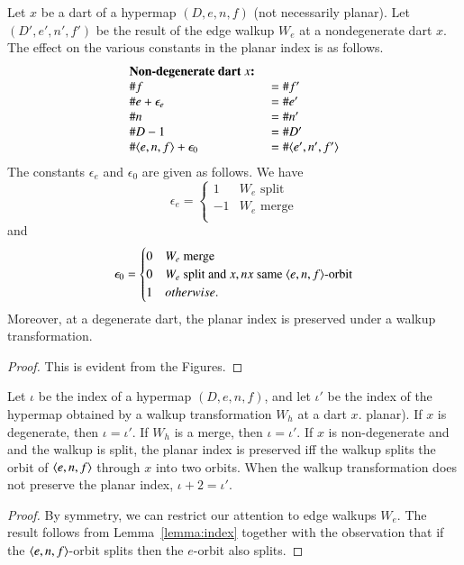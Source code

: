 \begin{lemma}\label{lemma:index} Let $x$ be a dart of a hypermap $(D,e,n,f)$ (not necessarily
planar). Let $(D',e',n',f')$ be the result of the edge walkup $W_e$ at
a nondegenerate dart $x$.  
The effect on the various constants in the planar index is as
follows.
    $$
    \begin{array}{lll}
    \text{\bf Non-degenerate dart $x$: }&\\
    \# f &= \# f'\\  
    \# e + \epsilon_e &= \# e'\\
    \# n &= \# n'\\
    \# D - 1&= \# D' \\
    \# \langle e,n,f\rangle + \epsilon_0&= \#\langle e',n',f'\rangle\\
    \end{array}
    $$
The constants $\epsilon_e$ and $\epsilon_0$ are given as follows.
We have 
   $$
   \epsilon_e = \begin{cases}
     1 & W_e \text{ split }\\
    -1 & W_e \text{ merge}\\
   \end{cases}
   $$
and
   $$
   \epsilon_0 = \begin{cases}
    0 & W_e \text{ merge }\\
    0 & W_e \text{ split and } x,nx \text{ same } \langle e,n,f\rangle\text{-orbit}\\
    1 & otherwise.
     \end{cases}
   $$
Moreover, at a degenerate dart, the planar index is preserved under a
walkup transformation.
\end{lemma}

\begin{proof} This is evident from the Figures.
\end{proof}

\begin{lemma}  Let $\iota$ be the index of a  hypermap $(D,e,n,f)$, and
let $\iota'$ be the index of the hypermap obtained by a walkup transformation
$W_h$
at a dart $x$.
planar).   If $x$ is degenerate, then $\iota=\iota'$.
If $W_h$ is a merge, then $\iota=\iota'$.
If $x$ is non-degenerate and and the walkup is
split, the planar index is preserved iff the walkup splits the orbit of
$\langle e,n,f\rangle$ through $x$ into two orbits. When the walkup transformation
does not preserve the planar index, $\iota+2=\iota'$.
\end{lemma}

\begin{proof}  By symmetry, we can restrict our attention to 
edge walkups $W_e$.  The result follows from  Lemma~\ref{lemma:index} together
with the observation that if the $\langle e,n,f\rangle$-orbit splits then
the $e$-orbit also splits.
\end{proof}


